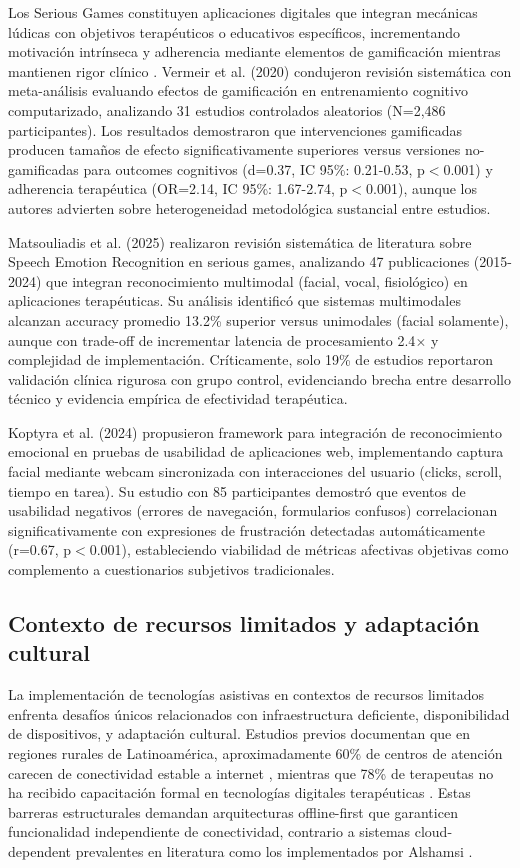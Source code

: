 \documentclass[journal,article,submit,pdftex,moreauthors]{Definitions/mdpi}
\begin{document}
	Los Serious Games constituyen aplicaciones digitales que integran mecánicas lúdicas con objetivos terapéuticos o educativos específicos, incrementando motivación intrínseca y adherencia mediante elementos de gamificación mientras mantienen rigor clínico \cite{ref24,ref26}. Vermeir et al. (2020) \cite{ref24} condujeron revisión sistemática con meta-análisis evaluando efectos de gamificación en entrenamiento cognitivo computarizado, analizando 31 estudios controlados aleatorios (N=2,486 participantes). Los resultados demostraron que intervenciones gamificadas producen tamaños de efecto significativamente superiores versus versiones no-gamificadas para outcomes cognitivos (d=0.37, IC 95\%: 0.21-0.53, p$<$0.001) y adherencia terapéutica (OR=2.14, IC 95\%: 1.67-2.74, p$<$0.001), aunque los autores advierten sobre heterogeneidad metodológica sustancial entre estudios.
	
	Matsouliadis et al. (2025) \cite{ref23} realizaron revisión sistemática de literatura sobre Speech Emotion Recognition en serious games, analizando 47 publicaciones (2015-2024) que integran reconocimiento multimodal (facial, vocal, fisiológico) en aplicaciones terapéuticas. Su análisis identificó que sistemas multimodales alcanzan accuracy promedio 13.2\% superior versus unimodales (facial solamente), aunque con trade-off de incrementar latencia de procesamiento 2.4$\times$ y complejidad de implementación. Críticamente, solo 19\% de estudios reportaron validación clínica rigurosa con grupo control, evidenciando brecha entre desarrollo técnico y evidencia empírica de efectividad terapéutica.
	
	Koptyra et al. (2024) \cite{ref25} propusieron framework para integración de reconocimiento emocional en pruebas de usabilidad de aplicaciones web, implementando captura facial mediante webcam sincronizada con interacciones del usuario (clicks, scroll, tiempo en tarea). Su estudio con 85 participantes demostró que eventos de usabilidad negativos (errores de navegación, formularios confusos) correlacionan significativamente con expresiones de frustración detectadas automáticamente (r=0.67, p$<$0.001), estableciendo viabilidad de métricas afectivas objetivas como complemento a cuestionarios subjetivos tradicionales.
	
	\subsection{Contexto de recursos limitados y adaptación cultural}
	
	La implementación de tecnologías asistivas en contextos de recursos limitados enfrenta desafíos únicos relacionados con infraestructura deficiente, disponibilidad de dispositivos, y adaptación cultural. Estudios previos documentan que en regiones rurales de Latinoamérica, aproximadamente 60\% de centros de atención carecen de conectividad estable a internet \cite{ref27,ref28}, mientras que 78\% de terapeutas no ha recibido capacitación formal en tecnologías digitales terapéuticas \cite{ref27}. Estas barreras estructurales demandan arquitecturas offline-first que garanticen funcionalidad independiente de conectividad, contrario a sistemas cloud-dependent prevalentes en literatura como los implementados por Alshamsi \cite{ref1}.
	
\end{document}
